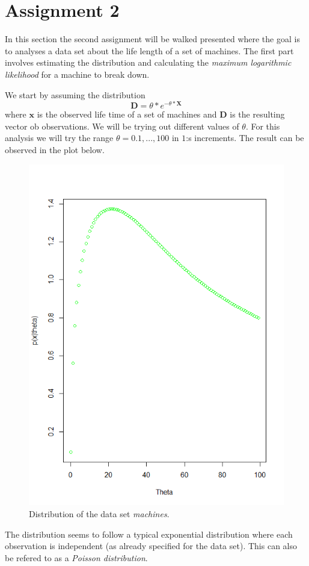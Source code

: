 \documentclass[a4paper,12pt]{article}
\begin{document}
\section{Assignment 2}

In this section the second assignment will be walked presented where the goal is to analyses a data set about the life length of a set of machines. The first part involves estimating the distribution and calculating the \textit{maximum logarithmic likelihood} for a machine to break down. 

We start by assuming the distribution 
\begin{equation}
  \mathbf{D} = \theta * e^{-\theta * \mathbf{X}}
\end{equation}
where \(\mathbf{x}\) is the observed life time of a set of machines and \( \mathbf{D} \) is the resulting vector ob observations. We will be trying out different values of \(\theta\). For this analysis we will try the range \( \theta = 0.1,...,100\) in  \(1\):s increments. The result can be observed in the plot below.
\begin{figure}[H]
\centering
\begin{minipage}[]{0.5\textwidth}
  \includegraphics[width=\textwidth]{figures/Lab1_A2_data_distribution.png}  
  \caption{Distribution of the data set \textit{machines}.\label{fig:Distribution of the data set machines} }
 \end{minipage}
\end{figure}
The distribution seems to follow a typical exponential distribution where each observation is independent (as already specified for the data set). This can also be refered to as a \textit{Poisson distribution}.
\end{document}

